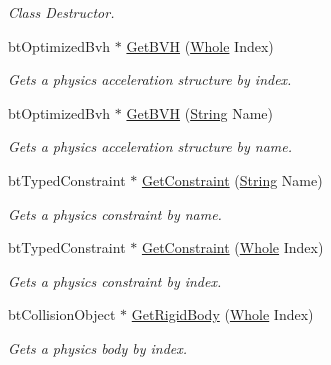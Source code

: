 \begin{DoxyCompactItemize}
\begin{DoxyCompactList}\small\item\em Class Destructor. \item\end{DoxyCompactList}\item 
btOptimizedBvh $\ast$ \hyperlink{classMezzanine_1_1internal_1_1BulletFile_a2dde44110919e77dc30f1d9bcb67f72c}{GetBVH} (\hyperlink{namespaceMezzanine_adcbb6ce6d1eb4379d109e51171e2e493}{Whole} Index)
\begin{DoxyCompactList}\small\item\em Gets a physics acceleration structure by index. \item\end{DoxyCompactList}\item 
btOptimizedBvh $\ast$ \hyperlink{classMezzanine_1_1internal_1_1BulletFile_ad65aa0b36affe887059183273892509e}{GetBVH} (\hyperlink{namespaceMezzanine_acf9fcc130e6ebf08e3d8491aebcf1c86}{String} Name)
\begin{DoxyCompactList}\small\item\em Gets a physics acceleration structure by name. \item\end{DoxyCompactList}\item 
btTypedConstraint $\ast$ \hyperlink{classMezzanine_1_1internal_1_1BulletFile_a19c9af33b87c133841c6e6e23959f201}{GetConstraint} (\hyperlink{namespaceMezzanine_acf9fcc130e6ebf08e3d8491aebcf1c86}{String} Name)
\begin{DoxyCompactList}\small\item\em Gets a physics constraint by name. \item\end{DoxyCompactList}\item 
btTypedConstraint $\ast$ \hyperlink{classMezzanine_1_1internal_1_1BulletFile_a36ae70fd657b6c0293b252abf52694a5}{GetConstraint} (\hyperlink{namespaceMezzanine_adcbb6ce6d1eb4379d109e51171e2e493}{Whole} Index)
\begin{DoxyCompactList}\small\item\em Gets a physics constraint by index. \item\end{DoxyCompactList}\item 
btCollisionObject $\ast$ \hyperlink{classMezzanine_1_1internal_1_1BulletFile_a72b2b29170c96646926467452ba913c6}{GetRigidBody} (\hyperlink{namespaceMezzanine_adcbb6ce6d1eb4379d109e51171e2e493}{Whole} Index)
\begin{DoxyCompactList}\small\item\em Gets a physics body by index. \item\end{DoxyCompactList}\item 

\end{DoxyCompactItemize}
